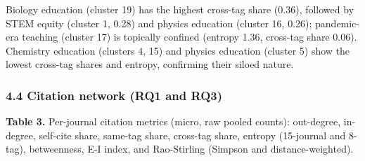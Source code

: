 \documentclass[pdflatex,sn-apa]{sn-jnl}
\begin{document}
Biology education (cluster 19) has the highest cross-tag share (0.36),
followed by STEM equity (cluster 1, 0.28) and physics education (cluster
16, 0.26); pandemic-era teaching (cluster 17) is topically confined
(entropy 1.36, cross-tag share 0.06). Chemistry education (clusters 4,
15) and physics education (cluster 5) show the lowest cross-tag shares
and entropy, confirming their siloed nature.

\subsubsection{4.4 Citation network (RQ1 and
RQ3)}\label{citation-network-rq1-and-rq3}

\textbf{Table 3.} Per-journal citation metrics (micro, raw pooled
counts): out-degree, in-degree, self-cite share, same-tag share,
cross-tag share, entropy (15-journal and 8-tag), betweenness, E-I index,
and Rao-Stirling (Simpson and distance-weighted).
\end{document}
